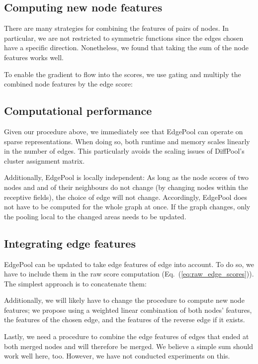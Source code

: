 \documentclass{article}
\newcommand{\equationref}[1]{Eq.~(\ref{#1})}
\newcommand{\edgepool}{EdgePool}
\begin{document}
\subsection{Computing new node features}

There are many strategies for combining the features of pairs of nodes. In particular, we are not restricted  to symmetric functions since the edges chosen have a specific direction. Nonetheless, we found that taking the sum of the node features works well.

To enable the gradient to flow into the scores, we use gating and multiply the combined node features by the edge score:




\subsection{Computational performance}
Given our procedure above, we immediately see that \edgepool{} can operate on sparse representations. When doing so, both runtime and memory scales linearly in the number of edges. This particularly avoids the scaling issues of DiffPool's cluster assignment matrix.

Additionally, \edgepool{} is locally independent: As long as the node scores of two nodes  and  and of their neighbours do not change (by changing nodes within the receptive fields), the choice of edge  will not change. Accordingly, \edgepool{} does not have to be computed for the whole graph at once. If the graph changes, only the pooling local to the changed areas needs to be updated.


\subsection{Integrating edge features}

\edgepool{} can be updated to take edge features  of edge  into account. To do so, we have to include them in the raw score computation (\equationref{eq:raw_edge_scores}). The simplest approach is to concatenate them:



Additionally, we will likely have to change the procedure to compute new node features; we propose using a weighted linear combination of both nodes' features, the features of the chosen edge, and the features of the reverse edge if it exists.

Lastly, we need a procedure to combine the edge features of edges that ended at both merged nodes and will therefore be merged. We believe a simple sum should work well here, too. However, we have not conducted experiments on this.
\end{document}
